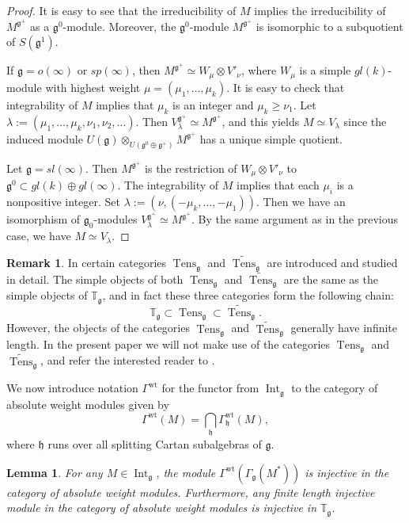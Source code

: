 \documentclass{amsart}
\renewcommand{\sl}{sl}
\newcommand{\so}{o}
\newcommand{\Tg}{\mathbb T_{\mathfrak g}}
\renewcommand{\sp}{sp}
\renewcommand{\gg}{\mathfrak{g}}
\newcommand{\hh}{\mathfrak{h}}
\newtheorem{lemma}[thm]{Lemma}
\theoremstyle{definition}
\newtheorem{rem}[thm]{Remark}
\numberwithin{equation}{section}
\begin{document}
\begin{proof}
It is easy to see that the irreducibility of $M$ implies the
irreducibility of $M^{\gg^+}$ as a $\gg^0$-module.  
Moreover, the $\gg^0$-module $M^{\gg^+}$ is isomorphic to a
subquotient of $S (\gg^1)$.

If $\gg=\so(\infty)$ or $\sp(\infty)$, then $M^{\gg^+}\simeq W_{\mu}\otimes V'_{\nu}$,
where $W_{\mu}$ is a simple $gl(k)$-module with highest weight $\mu=(\mu_1,\dots,\mu_k)$.
It is easy to check that integrability of $M$ implies that $\mu_k$ is an integer and
$\mu_k\geq\nu_1$. Let
$\lambda :=(\mu_1,\dots,\mu_k,\nu_1,\nu_2,\dots)$. Then
$V_\lambda^{\gg^+}\simeq  M^{\gg^+}$, and this yields  
$M\simeq V_\lambda$ since  the induced module $U(\gg) \otimes_{U(\gg^0  \oplus\gg^+)} M^{\gg^+}$ has a unique simple quotient.

Let $\gg=\sl(\infty)$. Then $M^{\gg^+}$ is the restriction of $W_\mu\otimes V'_{\nu}$
to $\gg^0 \subset gl(k)\oplus gl(\infty)$. The integrability of $M$ implies that each $\mu_i$ is a nonpositive integer. Set
$\lambda :=(\nu,(-\mu_k,\dots,-\mu_1))$. Then we have an isomorphism of $\gg_0$-modules
$V_\lambda^{\gg^+}\simeq  M^{\gg^+}$. 
By the same argument as in the previous case,
we have $M\simeq V_\lambda$.
\end{proof}


\begin{rem}
In \cite{PS} certain categories $\operatorname{Tens}_\gg$ and $\widetilde{\operatorname{Tens}}_\gg$ are introduced and studied in detail.  The simple objects of both $\operatorname{Tens}_\gg$ and $\widetilde{\operatorname{Tens}}_\gg$ are the same as the simple objects of $\Tg$, and in fact these three categories form the following chain:
$$\Tg \subset \operatorname{Tens}_\gg \subset \widetilde{\operatorname{Tens}}_\gg.$$
However, the objects of the categories $\operatorname{Tens}_\gg$ and $\widetilde{\operatorname{Tens}}_\gg$ generally have infinite length.  In the present paper we will not make use of the categories $\operatorname{Tens}_\gg$ and $\widetilde{\operatorname{Tens}}_\gg$, and refer the interested reader to \cite{PS}.
\end{rem}


We now introduce notation $\Gamma^\mathrm{wt}$ for the functor from $\operatorname{Int}_\gg$ to the category of absolute weight modules given by
$$\Gamma^\mathrm{wt} (M) = \bigcap_\hh \Gamma^\mathrm{wt}_\hh (M),$$
where $\hh$ runs over all splitting Cartan subalgebras of $\gg$.

\begin{lemma} \label{rtadjoint}
For any $M \in \operatorname{Int}_\gg$, the module
$\Gamma^\mathrm{wt} (\Gamma_\gg (M^*))$ is injective in the category of absolute weight modules.  Furthermore, any finite length injective module in the category of absolute weight modules is injective in $\Tg$.
\end{lemma}
\end{document}
